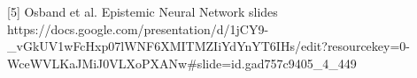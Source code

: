 \documentclass[preview]{standalone}
\begin{document}
\begin{center}
[5] Osband et al. Epistemic Neural Network slides\\https://docs.google.com/presentation/d/1jCY9-\_vGkUV1wFcHxp07lWNF6XMITMZIiYdYnYT6IHs/edit?resourcekey=0-WceWVLKaJMiJ0VLXoPXANw\#slide=id.gad757c9405\_4\_449
\end{center}
\end{document}

